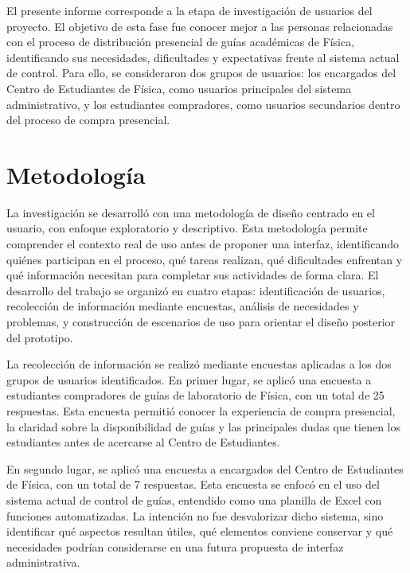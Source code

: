 \documentclass[12pt,letterpaper]{article}
\begin{document}
\tableofcontents
\newpage

El presente informe corresponde a la etapa de investigación de usuarios del proyecto. El objetivo de esta fase fue conocer mejor a las personas relacionadas con el proceso de distribución presencial de guías académicas de Física, identificando sus necesidades, dificultades y expectativas frente al sistema actual de control. Para ello, se consideraron dos grupos de usuarios: los encargados del Centro de Estudiantes de Física, como usuarios principales del sistema administrativo, y los estudiantes compradores, como usuarios secundarios dentro del proceso de compra presencial.

\section{Metodología}

La investigación se desarrolló con una metodología de diseño centrado en el usuario, con enfoque exploratorio y descriptivo. Esta metodología permite comprender el contexto real de uso antes de proponer una interfaz, identificando quiénes participan en el proceso, qué tareas realizan, qué dificultades enfrentan y qué información necesitan para completar sus actividades de forma clara. El desarrollo del trabajo se organizó en cuatro etapas: identificación de usuarios, recolección de información mediante encuestas, análisis de necesidades y problemas, y construcción de escenarios de uso para orientar el diseño posterior del prototipo.

La recolección de información se realizó mediante encuestas aplicadas a los dos grupos de usuarios identificados. En primer lugar, se aplicó una encuesta a estudiantes compradores de guías de laboratorio de Física, con un total de 25 respuestas. Esta encuesta permitió conocer la experiencia de compra presencial, la claridad sobre la disponibilidad de guías y las principales dudas que tienen los estudiantes antes de acercarse al Centro de Estudiantes.

En segundo lugar, se aplicó una encuesta a encargados del Centro de Estudiantes de Física, con un total de 7 respuestas. Esta encuesta se enfocó en el uso del sistema actual de control de guías, entendido como una planilla de Excel con funciones automatizadas. La intención no fue desvalorizar dicho sistema, sino identificar qué aspectos resultan útiles, qué elementos conviene conservar y qué necesidades podrían considerarse en una futura propuesta de interfaz administrativa.
\end{document}
